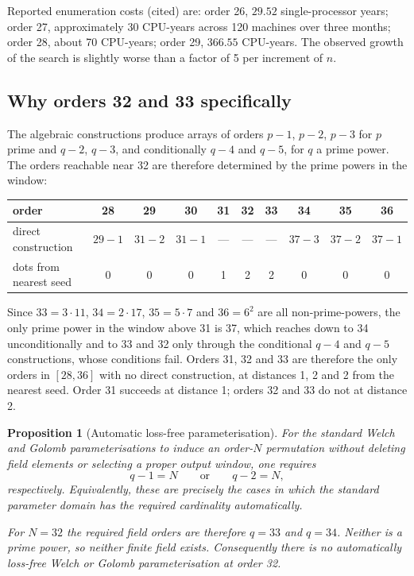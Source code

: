 \documentclass[11pt,a4paper]{article}
\newtheorem{proposition}[theorem]{Proposition}
\theoremstyle{definition}
\begin{document}
Reported enumeration costs (cited) are: order 26, $29.52$ single-processor
years; order 27, approximately 30 CPU-years across 120 machines over three
months; order 28, about 70 CPU-years; order 29, $366.55$ CPU-years. The observed
growth of the search is slightly worse than a factor of 5 per increment of $n$.

\subsection{Why orders 32 and 33 specifically}

The algebraic constructions produce arrays of orders $p-1$, $p-2$, $p-3$ for $p$
prime and $q-2$, $q-3$, and conditionally $q-4$ and $q-5$, for $q$ a prime
power. The orders reachable near 32 are therefore determined by the prime powers
in the window:

\begin{center}
\begin{tabular}{@{}lccccccccc@{}}
\toprule
order & 28 & 29 & 30 & \textbf{31} & \textbf{32} & \textbf{33} & 34 & 35 & 36 \\
\midrule
direct construction & $29{-}1$ & $31{-}2$ & $31{-}1$ & --- & --- & --- &
  $37{-}3$ & $37{-}2$ & $37{-}1$ \\
dots from nearest seed & 0 & 0 & 0 & 1 & 2 & 2 & 0 & 0 & 0 \\
\bottomrule
\end{tabular}
\end{center}

Since $33 = 3\cdot 11$, $34 = 2\cdot 17$, $35 = 5\cdot 7$ and $36 = 6^2$ are all
non-prime-powers, the only prime power in the window above 31 is 37, which
reaches down to 34 unconditionally and to 33 and 32 only through the conditional
$q-4$ and $q-5$ constructions, whose conditions fail. Orders 31, 32 and 33 are
therefore the only orders in $[28,36]$ with no direct construction, at distances
1, 2 and 2 from the nearest seed. Order 31 succeeds at distance 1; orders 32 and
33 do not at distance 2.

\begin{proposition}[Automatic loss-free parameterisation]
\label{prop:polydual}
For the standard Welch and Golomb parameterisations to induce an order-$N$
permutation without deleting field elements or selecting a proper output window,
one requires
\[
q-1=N \qquad\text{or}\qquad q-2=N,
\]
respectively. Equivalently, these are precisely the cases in which the standard
parameter domain has the required cardinality automatically.

For $N=32$ the required field orders are therefore $q=33$ and $q=34$. Neither is
a prime power, so neither finite field exists. Consequently there is no
automatically loss-free Welch or Golomb parameterisation at order 32.
\end{proposition}
\end{document}

